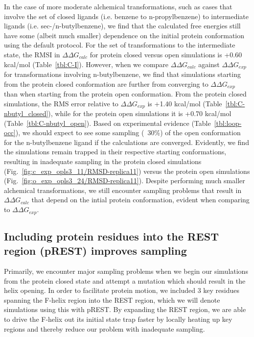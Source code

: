\documentclass[journal=jctcce,manuscript=article]{achemso}
\begin{document}
In the case of more moderate alchemical transformations, such as cases that involve the set of closed ligands (i.e. benzene to n-propylbenzene) to intermediate ligands (i.e. sec-/n-butylbenzene), we find that the calculated free energies still have some (albeit much smaller) dependence on the initial protein conformation using the default protocol.
For the set of transformations to the intermediate state, the RMSI in $\Delta\Delta G_{calc}$ for protein closed versus open simulations is +0.60 kcal/mol (Table~\ref{tbl:C-I}). 
However, when we compare $\Delta\Delta G_{calc}$ against $\Delta\Delta G_{exp}$ for transformations involving n-butylbenzene, we find that simulations starting from the protein closed conformation are further from converging to $\Delta\Delta G_{exp}$ than when starting from the protein open conformation.
From the protein closed simulations, the RMS error relative to $\Delta\Delta G_{exp}$ is +1.40 kcal/mol (Table~\ref{tbl:C-nbutyl_closed}), while for the protein open simulations it is +0.70 kcal/mol (Table~\ref{tbl:C-nbutyl_open}).
Based on experimental evidence (Table~\ref{tbl:loop-occ}), we should expect to see some sampling (~30\%) of the open conformation for the n-butylbenzene ligand if the calculations are converged.
Evidently, we find the simulations remain trapped in their respective starting conformations, resulting in inadequate sampling in the protein closed simulations (Fig.~\ref{fig:c_exp_opls3_11/RMSD-replica11}) versus the protein open simulations (Fig.~\ref{fig:o_exp_opls3_24/RMSD-replica11}).
Despite performing much smaller alchemical transformations, we still encounter sampling problems that result in $\Delta\Delta G_{calc}$ that depend on the intial protein conformation, evident when comparing to $\Delta\Delta G_{exp}$.

\subsection*{Including protein residues into the REST region (pREST) improves sampling}
Primarily, we encounter major sampling problems when we begin our simulations from the protein closed state and attempt a mutation which should result in the helix opening.
In order to facilitate protein motion, we included 3 key residues spanning the F-helix region into the REST region, which we will denote simulations using this with pREST. %
By expanding the REST region, we are able to drive the F-helix out its initial state trap faster by locally heating up key regions and thereby reduce our problem with inadequate sampling.
\end{document}
